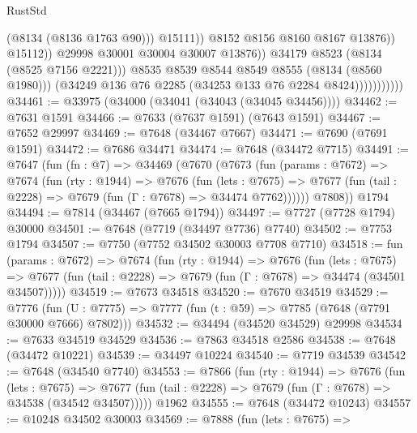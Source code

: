 \begin{lexlean}{RustStd}
\begin{coremodule}
{\begin{coremodule}
{{{{{{{{{{{{{{{{{{{{{{{{{{{{{{{{{{{{{{{{{{{{{{{{{{{{{                                            (@8134 (@8136 @1763 @90)))
                                          @15111))
                                      @8152
                                      @8156
                                      @8160
                                      @8167
                                      @13876))
                                  @15112))
                              @29998
                              @30001
                              @30004
                              @30007
                              @13876))
                          @34179
                          @8523
                          (@8134 (@8525 @7156 @2221)))
                        @8535
                        @8539
                        @8544
                        @8549
                        @8555
                        (@8134 (@8560 @1980)))
                      (@34249 @136 @76 @2285 (@34253 @133 @76 @2284 @8424)))))))))))
@34461 := @33975 (@34000 (@34041 (@34043 (@34045 @34456))))
@34462 := @7631 @1591
@34466 := @7633 (@7637 @1591) (@7643 @1591)
@34467 := @7652 @29997
@34469 := @7648 (@34467 @7667)
@34471 := @7690 (@7691 @1591)
@34472 := @7686 @34471
@34474 := @7648 (@34472 @7715)
@34491 := @7647
    (fun (fn : @7) =>
    @34469
      (@7670
        (@7673
          (fun (params : @7672) =>
          @7674
            (fun (rty : @1944) =>
            @7676
              (fun (lets : @7675) =>
              @7677 (fun (tail : @2228) => @7679 (fun (Γ : @7678) => @34474 @7762))))))
        @7808))
    @1794
@34494 := @7814 (@34467 (@7665 @1794))
@34497 := @7727 (@7728 @1794) @30000
@34501 := @7648 (@7719 (@34497 @7736) @7740)
@34502 := @7753 @1794
@34507 := @7750 (@7752 @34502 @30003 @7708 @7710)
@34518 := fun (params : @7672) =>
  @7674
    (fun (rty : @1944) =>
    @7676
      (fun (lets : @7675) =>
      @7677 (fun (tail : @2228) => @7679 (fun (Γ : @7678) => @34474 (@34501 @34507)))))
@34519 := @7673 @34518
@34520 := @7670 @34519
@34529 := @7776
    (fun (U : @7775) => @7777 (fun (t : @59) => @7785 (@7648 (@7791 @30000 @7666) @7802)))
@34532 := @34494 (@34520 @34529) @29998
@34534 := @7633 @34519 @34529
@34536 := @7863 @34518 @2586
@34538 := @7648 (@34472 @10221)
@34539 := @34497 @10224
@34540 := @7719 @34539
@34542 := @7648 (@34540 @7740)
@34553 := @7866
    (fun (rty : @1944) =>
    @7676
      (fun (lets : @7675) =>
      @7677 (fun (tail : @2228) => @7679 (fun (Γ : @7678) => @34538 (@34542 @34507)))))
    @1962
@34555 := @7648 (@34472 @10243)
@34557 := @10248 @34502 @30003
@34569 := @7888
    (fun (lets : @7675) =>
}}}}}}}}}}}}}}}}}}}}}}}}}}}}}}}}}}}}}}}}}}}}}}}}}}}}}
\end{coremodule}}
\end{coremodule}
\end{lexlean}
